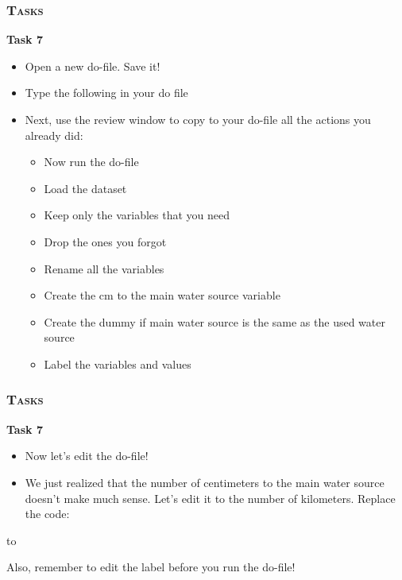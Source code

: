 \documentclass[10pt]{beamer}
\begin{document}
	\begin{frame}
		\frametitle{\textsc{Tasks}}
		\begin{center}	
			\Large\textbf{Task 7}
		\end{center}
		\begin{itemize}
			\item Open a new do-file. Save it! 
			\item Type the following in your do file
			\end{itemize}
\begin{stlog}\end{stlog}
		\begin{itemize}
			\item Next, use the review window to copy to your do-file all the actions you already did:
			\begin{itemize}
				\item Now run the do-file
				\item Load the dataset 
				\item Keep only the variables that you need
				\item Drop the ones you forgot
				\item Rename all the variables
				\item Create the cm to the main water source variable
				\item Create the dummy if main water source is the same as the used water source
				\item Label the variables and values
			\end{itemize}
		\end{itemize}	
	\end{frame}
	
	
	\begin{frame}
		\frametitle{\textsc{Tasks}}
		\begin{center}	
			\Large\textbf{Task 7}
		\end{center}	
		\begin{itemize}
			\item Now let’s edit the do-file!
			\item We just realized that the number of centimeters to the main water source doesn’t make much sense. Let’s edit it to the number of kilometers.  Replace the code:
			\end{itemize}
\begin{stlog}\end{stlog}
	to
\begin{stlog}\end{stlog}
	Also, remember to edit the label before you run the do-file!
	\end{frame}
	
\end{document}
